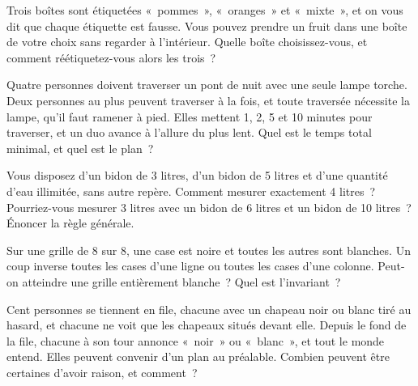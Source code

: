 \begin{question}\label{iq:iv1:logic-riddles:10}
Trois boîtes sont étiquetées «~pommes~», «~oranges~» et «~mixte~», et on vous dit que chaque étiquette est fausse. Vous pouvez prendre un fruit dans une boîte de votre choix sans regarder à l'intérieur. Quelle boîte choisissez-vous, et comment réétiquetez-vous alors les trois~?
\end{question}

\begin{question}\label{iq:iv1:logic-riddles:11}
Quatre personnes doivent traverser un pont de nuit avec une seule lampe torche. Deux personnes au plus peuvent traverser à la fois, et toute traversée nécessite la lampe, qu'il faut ramener à pied. Elles mettent 1, 2, 5 et 10 minutes pour traverser, et un duo avance à l'allure du plus lent. Quel est le temps total minimal, et quel est le plan~?
\end{question}

\begin{question}\label{iq:iv1:logic-riddles:12}
Vous disposez d'un bidon de 3 litres, d'un bidon de 5 litres et d'une quantité d'eau illimitée, sans autre repère. Comment mesurer exactement 4 litres~? Pourriez-vous mesurer 3 litres avec un bidon de 6 litres et un bidon de 10 litres~? Énoncer la règle générale.
\end{question}

\begin{question}\label{iq:iv1:logic-riddles:13}
Sur une grille de 8 sur 8, une case est noire et toutes les autres sont blanches. Un coup inverse toutes les cases d'une ligne ou toutes les cases d'une colonne. Peut-on atteindre une grille entièrement blanche~? Quel est l'invariant~?
\end{question}

\begin{question}\label{iq:iv1:logic-riddles:14}
Cent personnes se tiennent en file, chacune avec un chapeau noir ou blanc tiré au hasard, et chacune ne voit que les chapeaux situés devant elle. Depuis le fond de la file, chacune à son tour annonce «~noir~» ou «~blanc~», et tout le monde entend. Elles peuvent convenir d'un plan au préalable. Combien peuvent être certaines d'avoir raison, et comment~?
\end{question}


